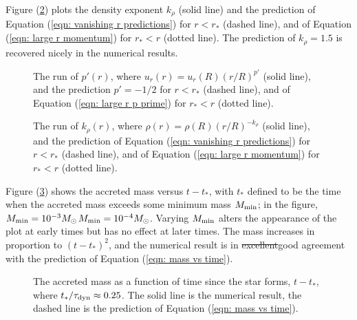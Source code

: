 \documentclass[iop,apj,numberedappendix]{emulateapj}
\newcommand       \phil[1]      {{\color{blue} #1}}
\newcommand       \tdyn         {\tau_{\rm dyn}}
\begin{document}
Figure (\ref{fig_k_rho_vs_r_101}) plots the density exponent $k_\rho$ 
\phil{(solid line) and the prediction of Equation (\ref{eqn: vanishing r predictions}) for $r<r_*$ (dashed line),
  and of Equation (\ref{eqn: large r momentum}) for $r_*<r$ (dotted line). The prediction of $k_{\rho} = 1.5$ is recovered nicely in the numerical results. }

\begin{figure}
\caption{\label{fig_p_prime_vs_r_101}The run of $p'(r)$, where $u_r(r)=u_r(R)(r/R)^{p\prime}$
  (solid line),
  and the prediction $p'=-1/2$ for $r<r_*$ (dashed line),
  and of Equation (\ref{eqn: large r p prime}) for $r_*<r$ (dotted line). }
\end{figure} %



\begin{figure}
\caption{\label{fig_k_rho_vs_r_101}The run of $k_\rho(r)$, where $\rho(r)=\rho(R)(r/R)^{-k_\rho}$
  (solid line),
  and the prediction of Equation (\ref{eqn: vanishing r predictions}) for $r<r_*$ (dashed line),
  and of Equation (\ref{eqn: large r momentum}) for $r_*<r$ (dotted line). }
\end{figure} %


Figure (\ref{fig_mass_vs_time_April_12}) shows the accreted mass
versus $t-t_*$, with $t_*$ defined to be the time when the accreted mass
exceeds some minimum mass $M_{\rm min}$; in the figure, \phil{\sout{$M_{\rm
  min}=10^{-3}M_\odot$}$M_{\rm min}=10^{-4}M_\odot$}. Varying $M_{\rm min}$ alters the appearance of
the plot at early times but has no effect at later times. The mass
increases in proportion to $(t-t_*)^2$, and the numerical result is in \phil{\sout{ excellent}good}
agreement with the prediction of Equation (\ref{eqn: mass vs time}).

\begin{figure}
\caption{\label{fig_mass_vs_time_April_12} The accreted mass as a
  function of time since the star forms, $t-t_*$, where
  $t_*/\tdyn\approx0.25$. The solid line is the numerical result, the
  dashed line is the prediction of Equation (\ref{eqn: mass vs
    time}). }
\end{figure}

\end{document}
